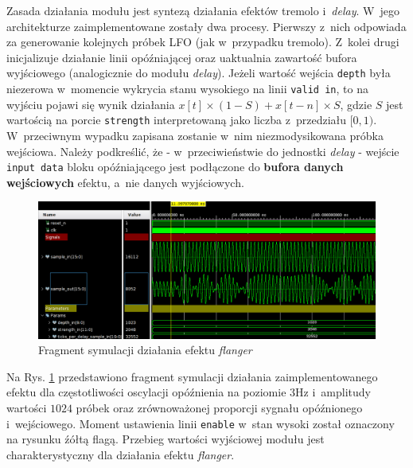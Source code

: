 Zasada działania modułu jest syntezą działania efektów tremolo i~\textit{delay}. W~jego architekturze zaimplementowane zostały dwa procesy. Pierwszy z~nich odpowiada za generowanie kolejnych próbek LFO (jak w~przypadku tremolo). Z~kolei drugi inicjalizuje działanie linii opóźniającej oraz uaktualnia zawartość bufora wyjściowego (analogicznie do modułu \textit{delay}). Jeżeli wartość wejścia \verb|depth| była niezerowa w~momencie wykrycia stanu wysokiego na linii \verb|valid in|, to na wyjściu pojawi się wynik działania $x[t] \times (1 - S) + x[t-n] \times S$, gdzie $S$ jest wartością na porcie \verb|strength| interpretowaną jako liczba z~przedziału $[0,1)$. W~przeciwnym wypadku zapisana zostanie w~nim niezmodysikowana próbka wejściowa. Należy podkreślić, że - w~przeciwieństwie do jednostki \textit{delay} - wejście \verb|input data| bloku opóźniającego jest podłączone do \textbf{bufora danych wejściowych} efektu, a~nie danych wyjściowych. 

\vspace{0.5cm}
\begin{figure}[ht]
    \centering
    \includegraphics[width=\textwidth]{img/sim/flanger_sim.png}
    \captionsetup{format=plain,justification=centering}
    \caption{Fragment symulacji działania efektu \textit{flanger}}
    \label{sim-flanger}
\end{figure}
\vspace{0.5cm}

Na Rys. \ref{sim-flanger} przedstawiono fragment symulacji działania zaimplementowanego efektu dla częstotliwości oscylacji opóźnienia na poziomie $3$Hz i~amplitudy wartości $1024$ próbek oraz zrównoważonej proporcji sygnału opóźnionego i~wejściowego. Moment ustawienia linii \verb|enable| w~stan wysoki został oznaczony na rysunku źółtą flagą. Przebieg wartości wyjściowej modułu jest charakterystyczny dla działania efektu \textit{flanger}.

